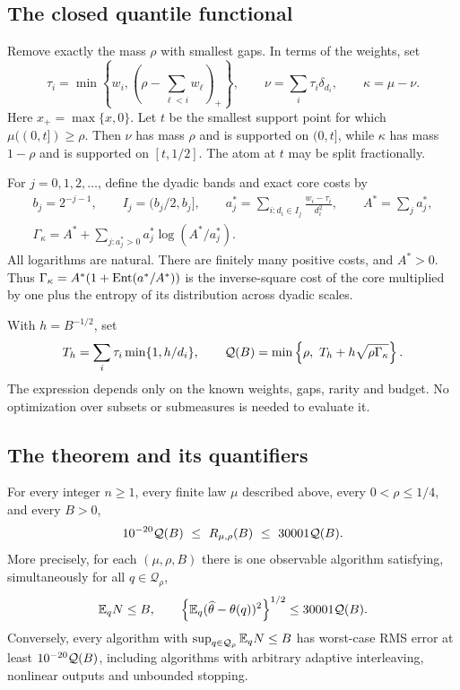 \subsection{The closed quantile functional}
Remove exactly the mass $\rho$ with smallest gaps. In terms of the
weights, set
\begin{equation}\label{fg:eq:quantile-split}
 \tau_i=\min\left\{w_i,\left(\rho-\sum_{\ell<i}w_\ell\right)_+\right\},
 \qquad \nu=\sum_i\tau_i\delta_{d_i},\qquad \kappa=\mu-\nu.
\end{equation}
Here $x_+=\max\{x,0\}$. Let $t$ be the smallest support point for
which $\mu((0,t])\ge\rho$. Then $\nu$ has mass $\rho$ and is supported
on $(0,t]$, while $\kappa$ has mass $1-\rho$ and is supported on
$[t,1/2]$. The atom at $t$ may be split fractionally.

For $j=0,1,2,\ldots$, define the dyadic bands and exact core costs by
\begin{equation}\label{fg:eq:core-entropy}
 \begin{gathered}
 b_j=2^{-j-1},\qquad I_j=(b_j/2,b_j],\qquad
 a_j^*=\sum_{i:d_i\in I_j}\frac{w_i-\tau_i}{d_i^2},
 \qquad A^*=\sum_j a_j^*,\\
 \Gamma_\kappa=A^*+\sum_{j:a_j^*>0}a_j^*\log(A^*/a_j^*).
 \end{gathered}
\end{equation}
All logarithms are natural. There are finitely many positive costs,
and $A^*>0$. Thus $\Gamma_\kappa=A^*(1+\operatorname{Ent}(a^*/A^*))$ is the
inverse-square cost of the core multiplied by one plus the entropy
of its distribution across dyadic scales.

With $h=B^{-1/2}$, set
\begin{equation}\label{fg:eq:closed-functional}
 T_h=\sum_i\tau_i\min\{1,h/d_i\},\qquad
 \mathcal Q(B)=\min\left\{\rho,\ T_h+h\sqrt{\rho\Gamma_\kappa}\right\}.
\end{equation}
The expression depends only on the known weights, gaps, rarity and
budget. No optimization over subsets or submeasures is needed to
evaluate it.

\subsection{The theorem and its quantifiers}
\begin{theorem}\label{fg:thm:direct-main}
For every integer $n\ge1$, every finite law $\mu$ described above,
every $0<\rho\le1/4$, and every $B>0$,
\begin{equation}\label{fg:eq:main-bounds}
       10^{-20}\mathcal Q(B)\ \le\ R_{\mu,\rho}(B)\ \le\ 30001\mathcal Q(B).
\end{equation}
More precisely, for each $(\mu,\rho,B)$ there is one observable
algorithm satisfying, simultaneously for all $q\in\mathcal Q_\rho$,
\[
 \mathbb E_qN\le B,\qquad
 \left\{\mathbb E_q(\widehat\theta-\theta(q))^2\right\}^{1/2}
 \le30001\mathcal Q(B).
\]
Conversely, every algorithm with
$\sup_{q\in\mathcal Q_\rho}\mathbb E_qN\le B$ has worst-case RMS error
at least $10^{-20}\mathcal Q(B)$, including algorithms with arbitrary
adaptive interleaving, nonlinear outputs and unbounded stopping.
\end{theorem}

